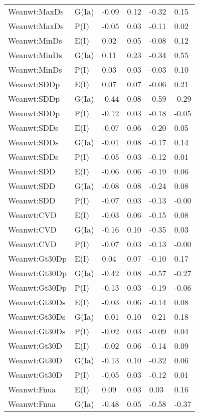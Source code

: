 \begin{center}
\begin{longtable}{|p{1.1in}|p{0.7in}|p{0.7in}|p{0.6in}|p{0.6in}|p{0.6in}|}
  Weanwt:MaxDs & G(Ia) & -0.09 & 0.12 & -0.32 & 0.15 \\ 
  Weanwt:MaxDs & P(I) & -0.05 & 0.03 & -0.11 & 0.02 \\ 
  Weanwt:MinDs & E(I) & 0.02 & 0.05 & -0.08 & 0.12 \\ 
  Weanwt:MinDs & G(Ia) & 0.11 & 0.23 & -0.34 & 0.55 \\ 
  Weanwt:MinDs & P(I) & 0.03 & 0.03 & -0.03 & 0.10 \\ 
  Weanwt:SDDp & E(I) & 0.07 & 0.07 & -0.06 & 0.21 \\ 
  Weanwt:SDDp & G(Ia) & -0.44 & 0.08 & -0.59 & -0.29 \\ 
  Weanwt:SDDp & P(I) & -0.12 & 0.03 & -0.18 & -0.05 \\ 
  Weanwt:SDDs & E(I) & -0.07 & 0.06 & -0.20 & 0.05 \\ 
  Weanwt:SDDs & G(Ia) & -0.01 & 0.08 & -0.17 & 0.14 \\ 
  Weanwt:SDDs & P(I) & -0.05 & 0.03 & -0.12 & 0.01 \\ 
  Weanwt:SDD & E(I) & -0.06 & 0.06 & -0.19 & 0.06 \\ 
  Weanwt:SDD & G(Ia) & -0.08 & 0.08 & -0.24 & 0.08 \\ 
  Weanwt:SDD & P(I) & -0.07 & 0.03 & -0.13 & -0.00 \\ 
  Weanwt:CVD & E(I) & -0.03 & 0.06 & -0.15 & 0.08 \\ 
  Weanwt:CVD & G(Ia) & -0.16 & 0.10 & -0.35 & 0.03 \\ 
  Weanwt:CVD & P(I) & -0.07 & 0.03 & -0.13 & -0.00 \\ 
  Weanwt:Gt30Dp & E(I) & 0.04 & 0.07 & -0.10 & 0.17 \\ 
  Weanwt:Gt30Dp & G(Ia) & -0.42 & 0.08 & -0.57 & -0.27 \\ 
  Weanwt:Gt30Dp & P(I) & -0.13 & 0.03 & -0.19 & -0.06 \\ 
  Weanwt:Gt30Ds & E(I) & -0.03 & 0.06 & -0.14 & 0.08 \\ 
  Weanwt:Gt30Ds & G(Ia) & -0.01 & 0.10 & -0.21 & 0.18 \\ 
  Weanwt:Gt30Ds & P(I) & -0.02 & 0.03 & -0.09 & 0.04 \\ 
  Weanwt:Gt30D & E(I) & -0.02 & 0.06 & -0.14 & 0.09 \\ 
  Weanwt:Gt30D & G(Ia) & -0.13 & 0.10 & -0.32 & 0.06 \\ 
  Weanwt:Gt30D & P(I) & -0.05 & 0.03 & -0.12 & 0.01 \\ 
  Weanwt:Fnua & E(I) & 0.09 & 0.03 & 0.03 & 0.16 \\ 
  Weanwt:Fnua & G(Ia) & -0.48 & 0.05 & -0.58 & -0.37 \\ 

\end{longtable}
\end{center}
